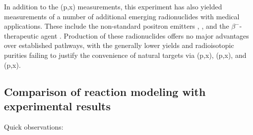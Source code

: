 In addition to the (p,x) measurements, this experiment has also yielded measurements of  a number of additional  emerging radionuclides with medical applications.
These include the non-standard positron emitters 
 \cite{Muller2013,Filosofov2010,Qaim2011}
 \cite{Thisgaard2011,Zaman1996,Hermanne2000a}
 \cite{PMID:7632762,zweit1996medium,Graves2016,Rosch2014}, 
 \cite{Szelecsenyi2005a,Fukumura2004}
 \cite{Lewis2003,Bandari2014,mp500671j,Szelecsenyi1993,Aslam2009,Hilgers2003,Szelecsenyi2005,Voyles2017},
and the $\beta^-$-therapeutic agent 
 \cite{Muller2014,Deilami-nezhad2016}.
Production of these radionuclides offers no major advantages over established pathways, with the generally lower yields and radioisotopic purities failing to justify the convenience of natural targets  via   (p,x), (p,x), and  (p,x). 




\subsection{Comparison of reaction modeling with experimental results}


Quick observations:

